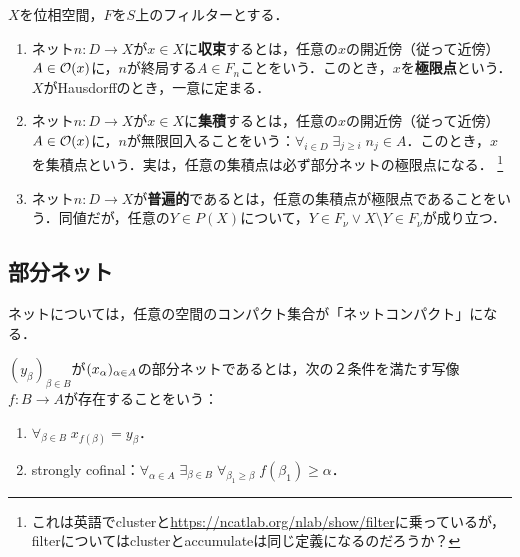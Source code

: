 \documentclass[uplatex,dvipdfmx]{jsreport}
\begin{document}
\begin{definition}
    $X$を位相空間，$F$を$S$上のフィルターとする．
    \begin{enumerate}
        \item ネット$n:D\to X$が$x\in X$に\textbf{収束}するとは，任意の$x$の開近傍（従って近傍）$A\in\mathcal{O}(x)$に，$n$が終局する$A\in F_n$ことをいう．このとき，$x$を\textbf{極限点}という．$X$がHausdorffのとき，一意に定まる．
        \item ネット$n:D\to X$が$x\in X$に\textbf{集積}するとは，任意の$x$の開近傍（従って近傍）$A\in\mathcal{O}(x)$に，$n$が無限回入ることをいう：$\forall_{i\in D}\;\exists_{j\ge i}\;n_j\in A$．このとき，$x$を集積点という．実は，任意の集積点は必ず部分ネットの極限点になる．
        \footnote{これは英語でclusterと\url{https://ncatlab.org/nlab/show/filter}に乗っているが，filterについてはclusterとaccumulateは同じ定義になるのだろうか？}
        \item ネット$n:D\to X$が\textbf{普遍的}であるとは，任意の集積点が極限点であることをいう．同値だが，任意の$Y\in P(X)$について，$Y\in F_\nu\lor X\setminus Y\in F_\nu$が成り立つ．
    \end{enumerate}
\end{definition}

\subsection{部分ネット}

\begin{tcolorbox}[colframe=ForestGreen, colback=ForestGreen!10!white,breakable,colbacktitle=ForestGreen!40!white,coltitle=black,fonttitle=\bfseries\sffamily,
title=]
    ネットについては，任意の空間のコンパクト集合が「ネットコンパクト」になる．
\end{tcolorbox}

\begin{definition}[Kelley 1955]\label{def-subnet-Kelley}
    $(y_\beta)_{\beta\in B}$が$(x_\alpha)_{\alpha\in A}$の部分ネットであるとは，次の２条件を満たす写像$f:B\to A$が存在することをいう：
    \begin{enumerate}
        \item $\forall_{\beta\in B}\;x_{f(\beta)}=y_\beta$．
        \item strongly cofinal：$\forall_{\alpha\in A}\;\exists_{\beta\in B}\;\forall_{\beta_1\ge\beta}\;f(\beta_1)\ge\alpha$．
    \end{enumerate}
\end{definition}
\end{document}
